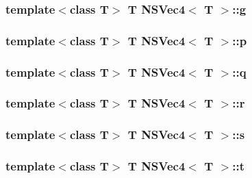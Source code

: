 \hypertarget{structNSVec4_a6a4f6a36a219e1b2d56828fb699109f7}{
\subsubsection[{g}]{\setlength{\rightskip}{0pt plus 5cm}template$<$class T$>$ T {\bf N\-S\-Vec4}$<$ T $>$\-::g}}\label{structNSVec4_a6a4f6a36a219e1b2d56828fb699109f7}
\hypertarget{structNSVec4_a50137268b80b5a2be6c5a4c57c7c5712}{
\subsubsection[{p}]{\setlength{\rightskip}{0pt plus 5cm}template$<$class T$>$ T {\bf N\-S\-Vec4}$<$ T $>$\-::p}}\label{structNSVec4_a50137268b80b5a2be6c5a4c57c7c5712}
\hypertarget{structNSVec4_a28bbe13de9699d2eefb69f3f5ac214f5}{
\subsubsection[{q}]{\setlength{\rightskip}{0pt plus 5cm}template$<$class T$>$ T {\bf N\-S\-Vec4}$<$ T $>$\-::q}}\label{structNSVec4_a28bbe13de9699d2eefb69f3f5ac214f5}
\hypertarget{structNSVec4_afa2b1cf8a7a43876ca3b70bf74d25f39}{
\subsubsection[{r}]{\setlength{\rightskip}{0pt plus 5cm}template$<$class T$>$ T {\bf N\-S\-Vec4}$<$ T $>$\-::r}}\label{structNSVec4_afa2b1cf8a7a43876ca3b70bf74d25f39}
\hypertarget{structNSVec4_a560e89cd6a4d927bc6bee5c4581d3462}{
\subsubsection[{s}]{\setlength{\rightskip}{0pt plus 5cm}template$<$class T$>$ T {\bf N\-S\-Vec4}$<$ T $>$\-::s}}\label{structNSVec4_a560e89cd6a4d927bc6bee5c4581d3462}
\hypertarget{structNSVec4_a84aa4b91426f2ede9a22ebc01e4eaeff}{
\subsubsection[{t}]{\setlength{\rightskip}{0pt plus 5cm}template$<$class T$>$ T {\bf N\-S\-Vec4}$<$ T $>$\-::t}}\label{structNSVec4_a84aa4b91426f2ede9a22ebc01e4eaeff}

